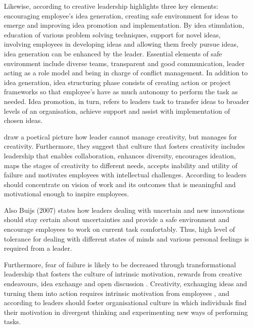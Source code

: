 Likewise, according to \citet{mumford2002leading} creative leadership highlights three key elements: encouraging employee's idea generation, creating safe environment for ideas to emerge and improving idea promotion and implementation. By idea stimulation, education of various problem solving techniques, support for novel ideas, involving employees in developing ideas and allowing them freely pursue ideas, idea generation can be enhanced by the leader. Essential elements of safe environment include diverse teams, transparent and good communication, leader acting as a role model and being in charge of conflict management. In addition to idea generation, idea structuring phase consists of creating action or project frameworks so that employee's have as much autonomy to perform the task as needed. Idea promotion, in turn, refers to leaders task to transfer ideas to broader levels of an organisation, achieve support and assist with implementation of chosen ideas. \citep{mumford2002leading} 

\citet{amabile2008creativity} draw a poetical picture how leader cannot manage creativity, but manages for creativity. Furthermore, they suggest that culture that fosters creativity includes leadership that enables collaboration, enhances diversity, encourages ideation, maps the stages of creativity to different needs, accepts inability and utility of failure and motivates employees with intellectual challenges. According to \citet{sosik1999leadership} leaders should concentrate on vision of work and its outcomes that is meaningful and motivational enough to inspire employees.

Also Buijs (2007) \citet{buijs2007innovation} states how leaders dealing with uncertain and new innovations should stay certain about uncertainties and provide a safe environment and encourage employees to work on current task comfortably. Thus, high level of tolerance for dealing with different states of minds and various personal feelings is required from a leader. \citep{buijs2007innovation} 

Furthermore, fear of failure is likely to be decreased through transformational leadership that fosters the culture of intrinsic motivation, rewards from creative endeavours, idea exchange and open discussion \citet{amabile1998kill}. Creativity, exchanging ideas and turning them into action requires intrinsic motivation from employees \citep{jung2001transformational}, and according to \citet{amabile1998kill} leaders should foster organisational culture in which individuals find their motivation in divergent thinking and experimenting new ways of performing tasks. 

